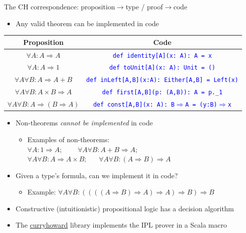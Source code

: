\documentclass[english]{beamer}
\providecommand{\tabularnewline}{\\}
\begin{document}
\begin{frame}{The CH correspondence: proposition$\rightarrow$type / proof$\rightarrow$code}

\begin{itemize}
\item Any valid theorem can be implemented in code
\end{itemize}
\begin{center}
\begin{tabular}{|c|c|}
\hline 
\textbf{Proposition} &
\textbf{Code}\tabularnewline
\hline 
\hline 
$\forall A:A\Rightarrow A$ &
\texttt{\textcolor{blue}{\footnotesize{}def identity{[}A{]}(x:\ A):\ A
= x}}\tabularnewline
\hline 
$\forall A:A\Rightarrow1$ &
\texttt{\textcolor{blue}{\footnotesize{}def toUnit{[}A{]}(x:\ A): Unit
= ()}}\tabularnewline
\hline 
$\forall A\forall B:A\Rightarrow A+B$ &
\texttt{\textcolor{blue}{\footnotesize{}def inLeft{[}A,B{]}(x:A):\ Either{[}A,B{]}
= Left(x)}}\tabularnewline
\hline 
$\forall A\forall B:A\times B\Rightarrow A$ &
\texttt{\textcolor{blue}{\footnotesize{}def first{[}A,B{]}(p:\ (A,B)):\ A
= p.\_1}}\tabularnewline
\hline 
$\forall A\forall B:A\Rightarrow(B\Rightarrow A)$ &
\texttt{\textcolor{blue}{\footnotesize{}def const{[}A,B{]}(x:\ A):\ B$\Rightarrow$A
= (y:B)$\Rightarrow$x}}\tabularnewline
\hline 
\end{tabular}
\par\end{center}
\begin{itemize}
\item Non-theorems \emph{cannot be implemented} in code 
\begin{itemize}
\item Examples of non-theorems:\\
 $\forall A:1\Rightarrow A$; \  \  $\quad\forall A\forall B:A+B\Rightarrow A$;
\\
$\forall A\forall B:A\Rightarrow A\times B$; \  $\quad\forall A\forall B:(A\Rightarrow B)\Rightarrow A$
\end{itemize}
\item Given a type's formula, can we implement it in code?
\begin{itemize}
\item Example: $\forall A\forall B:((((A\Rightarrow B)\Rightarrow A)\Rightarrow A)\Rightarrow B)\Rightarrow B$
\end{itemize}
\item Constructive (intuitionistic) propositional logic has a decision algorithm
\item The \href{https://github.com/Chymyst/curryhoward}{curryhoward} library
implements the IPL prover in a Scala macro
\end{itemize}
\end{frame}
\end{document}
